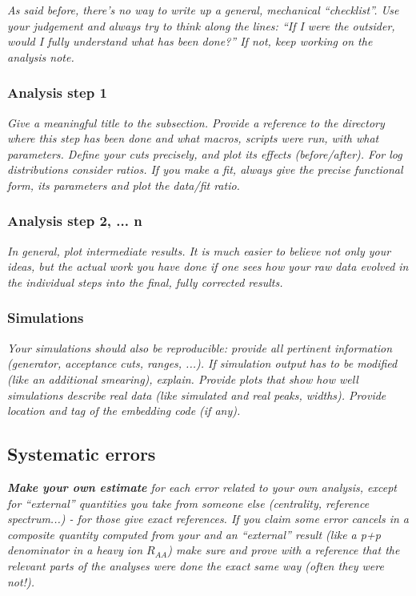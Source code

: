 \documentclass[12pt]{article}
\begin{document}
{\it As said before, there's no way to write up a general, mechanical
  ``checklist''.  Use your judgement and always try to think along the
  lines: ``If I were the outsider, would I fully understand what has
  been done?''  If not, keep working on the analysis note.
}

\subsubsection{Analysis step 1}

{\it
  Give a meaningful title to the subsection.  Provide a reference to
  the directory where this step has been done and what macros, scripts
  were run, with what parameters.
  Define your cuts precisely, and plot its
  effects (before/after).  For log distributions consider ratios.  If
  you make a fit, always give the precise functional form, its parameters
  and plot the data/fit ratio.
}



\subsubsection{Analysis step 2, ... n}

{\it
  In general, plot intermediate results.  It is much easier to believe
  not only your ideas, but the actual work you have done if one sees
  how your raw data evolved in the individual steps into the final,
  fully corrected results.
}

\subsubsection{Simulations}

{\it
  Your simulations should also be reproducible: provide all pertinent
  information (generator, acceptance cuts, ranges, ...).  If
  simulation output has to be modified (like an additional smearing),
  explain.  Provide plots that show how well simulations describe real
  data (like simulated and real peaks, widths).  
  Provide location and tag of the embedding code (if any).
}


\subsection{Systematic errors}

{\it 
{\bf Make your own estimate} for each error related to your own analysis,
except for ``external'' quantities you take from someone else (centrality,
reference spectrum...) - for those give exact references.  If you
claim some error cancels in a composite quantity computed from your
and an ``external'' result (like a p+p denominator in a heavy ion
$R_{AA}$) make sure and prove with a reference that the relevant parts
of the analyses were done the exact same way (often they were not!).
}
\end{document}
